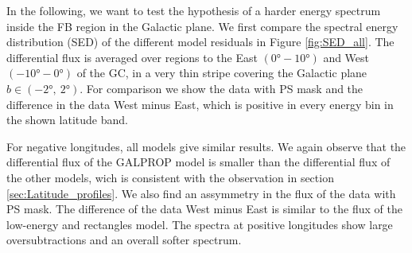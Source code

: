 In the following, we want to test the hypothesis of a harder energy spectrum inside the FB region in the Galactic plane. We first compare the spectral energy distribution (SED) of the different model residuals in Figure \ref{fig:SED_all}. The differential flux is averaged over regions to the East $(\ang{0} - \ang{10})$ and West $(\ang{-10} - \ang{0})$ of the GC, in a very thin stripe covering the Galactic plane $b \in (\ang{-2},\ \ang{2})$. For comparison we show the data with PS mask and the difference in the data West minus East, which is positive in every energy bin in the shown latitude band.

For negative longitudes, all models give similar results. We again observe that the differential flux of the GALPROP model is smaller than the differential flux of the other models, wich is consistent with the observation in section \ref{sec:Latitude_profiles}. We also find an assymmetry in the flux of the data with PS mask. The difference of the data West minus East is similar to the flux of the low-energy and rectangles model. The spectra at positive longitudes show large oversubtractions and an overall softer spectrum. %

